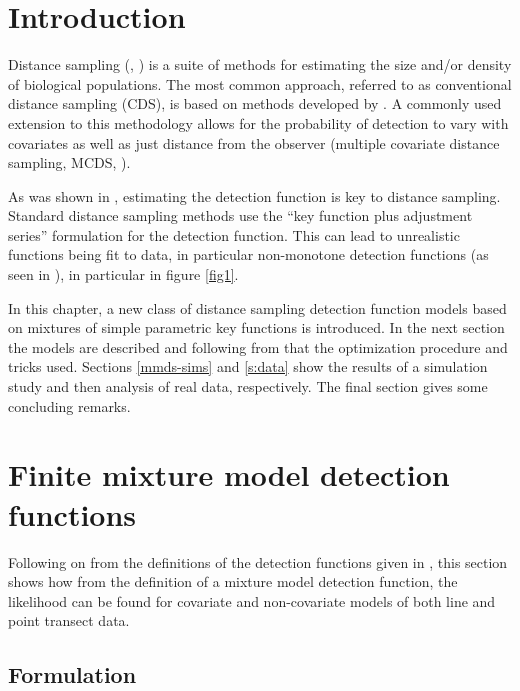 \label{chap-mmds}


\section{Introduction}
\label{s:intro}

Distance sampling (\cite{IDS}, \cite{ADS}) is a suite of methods for estimating the size and/or density of biological populations. The most common approach, referred to as conventional distance sampling (CDS), is based on methods developed by . A commonly used extension to this methodology allows for the probability of detection to vary with covariates as well as just distance from the observer (multiple covariate distance sampling, MCDS, \cite[chapter 3]{ADS}). 

As was shown in , estimating the detection function is key to distance sampling. Standard distance sampling methods use the ``key function plus adjustment series'' formulation for the detection function. This can lead to unrealistic functions being fit to data, in particular non-monotone detection functions (as seen in ), in particular in figure \ref{fig1}.

In this chapter, a new class of distance sampling detection function models based on mixtures of simple parametric key functions is introduced. In the next section the models are described and following from that the optimization procedure and tricks used. Sections \ref{mmds-sims} and \ref{s:data} show the results of a simulation study and then analysis of real data, respectively. The final section gives some concluding remarks.

\section{Finite mixture model detection functions}

Following on from the definitions of the detection functions given in , this section shows how from the definition of a mixture model detection function, the likelihood can be found for covariate and non-covariate models of both line and point transect data.

\subsection{Formulation}
\label{s:detfcts}

